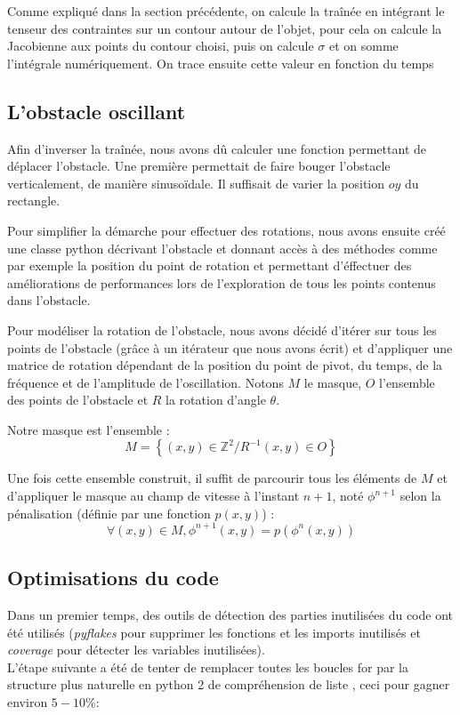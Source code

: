 		Comme expliqué dans la section précédente, on calcule la traînée en intégrant le tenseur des contraintes sur un contour autour de l'objet, pour cela on calcule la Jacobienne aux points du contour choisi, puis on calcule $\sigma$ et on somme l'intégrale numériquement. On trace ensuite cette valeur en fonction du temps
		
		
	\subsection{L'obstacle oscillant}
		
    Afin d'inverser la traînée, nous avons dû calculer une fonction
permettant de déplacer l'obstacle. Une première permettait de faire
bouger l'obstacle verticalement, de manière sinusoïdale. Il suffisait
de varier la position $oy$ du rectangle.

Pour simplifier la démarche pour effectuer des rotations,
nous avons ensuite créé une classe python décrivant l'obstacle et
donnant accès à des méthodes comme par exemple la position du point de
rotation et permettant d'éffectuer des améliorations de performances
lors de l'exploration de tous les points contenus dans l'obstacle.

Pour modéliser la rotation de l'obstacle, nous avons décidé d'itérer
sur tous les points de l'obstacle (grâce à un itérateur que nous avons
écrit) et d'appliquer une matrice de rotation dépendant de la position
du point de pivot, du temps, de la fréquence et de l'amplitude de
l'oscillation. Notons $M$ le masque, $O$
l'ensemble des points de l'obstacle et $R$ la rotation d'angle $\theta$.

Notre masque est l'ensemble :
\[ M = \left\lbrace (x,y) \in \mathbb{Z}^2 / R^{-1}(x,y)
  \in O \right\rbrace \]

Une fois cette ensemble construit, il suffit de parcourir tous les
éléments de $M$ et d'appliquer le masque au champ de vitesse à
l'instant $n+1$, noté $\phi^{n+1}$ selon la pénalisation (définie par
une fonction $p(x,y)$) : 
\[ \forall (x,y)\in M, \phi^{n+1}(x,y) = p(\phi^{n}(x,y)) \] 
		 
	\subsection{Optimisations du code}
		Dans un premier temps, des outils de détection des parties
inutilisées du code ont été utilisés (\emph{pyflakes} pour supprimer les
fonctions et les imports inutilisés et \emph{coverage} pour détecter les
variables inutilisées).\\
L'étape suivante a été de tenter de remplacer toutes les boucles for
par la structure plus naturelle en python 2 de compréhension de liste
, ceci pour gagner environ $5-10\%$:

